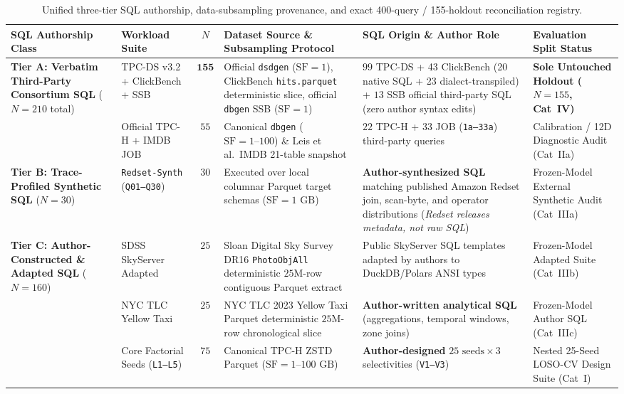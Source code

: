 \documentclass[10pt,a4paper]{article}
\begin{document}
\begin{table}[!t]
\centering
\caption{Unified three-tier SQL authorship, data-subsampling provenance, and exact 400-query / 155-holdout reconciliation registry.}
\label{tab:v12_data_provenance}\label{tab:v13_unified_provenance}
\scriptsize
\setlength{\tabcolsep}{3.5pt}
\renewcommand{\arraystretch}{1.14}
\begin{tabular}{@{}p{2.7cm}p{2.7cm}cp{3.8cm}p{3.4cm}p{2.5cm}@{}}
\toprule
\textbf{SQL Authorship Class} & \textbf{Workload Suite} & \textbf{$N$} & \textbf{Dataset Source \& Subsampling Protocol} & \textbf{SQL Origin \& Author Role} & \textbf{Evaluation Split Status} \\
\midrule
\textbf{Tier A: Verbatim Third-Party Consortium SQL} ($N=210$ total) & TPC-DS v3.2 + ClickBench + SSB & $\mathbf{155}$ & Official \texttt{dsdgen} ($\text{SF}=1$), ClickBench \texttt{hits.parquet} deterministic slice, official \texttt{dbgen} SSB ($\text{SF}=1$) & $99$ TPC-DS + 43 ClickBench (20 native SQL + 23 dialect-transpiled) + $13$ SSB official third-party SQL (zero author syntax edits) & \textbf{Sole Untouched Holdout ($N=155$, Cat~IV)} \\
& Official TPC-H + IMDB JOB & $55$ & Canonical \texttt{dbgen} ($\text{SF}=1\text{--}100$) \& Leis et al.\ IMDB 21-table snapshot & $22$ TPC-H + $33$ JOB (\texttt{1a--33a}) third-party queries & Calibration / 12D Diagnostic Audit (Cat~IIa) \\
\midrule
\textbf{Tier B: Trace-Profiled Synthetic SQL} ($N=30$) & \texttt{Redset-Synth} (\texttt{Q01--Q30}) & $30$ & Executed over local columnar Parquet target schemas ($\text{SF}=1\text{ GB}$) & \textbf{Author-synthesized SQL} matching published Amazon Redset join, scan-byte, and operator distributions (\emph{Redset releases metadata, not raw SQL}) & Frozen-Model External Synthetic Audit (Cat~IIIa) \\
\midrule
\textbf{Tier C: Author-Constructed \& Adapted SQL} ($N=160$) & SDSS SkyServer Adapted & $25$ & Sloan Digital Sky Survey DR16 \texttt{PhotoObjAll} deterministic $25\text{M}$-row contiguous Parquet extract & Public SkyServer SQL templates adapted by authors to DuckDB/Polars ANSI types & Frozen-Model Adapted Suite (Cat~IIIb) \\
& NYC TLC Yellow Taxi & $25$ & NYC TLC 2023 Yellow Taxi Parquet deterministic $25\text{M}$-row chronological slice & \textbf{Author-written analytical SQL} (aggregations, temporal windows, zone joins) & Frozen-Model Author SQL (Cat~IIIc) \\
& Core Factorial Seeds (\texttt{L1--L5}) & $75$ & Canonical TPC-H ZSTD Parquet ($\text{SF}=1\text{--}100\text{ GB}$) & \textbf{Author-designed} $25\text{ seeds}\times 3$ selectivities (\texttt{V1--V3}) & Nested 25-Seed LOSO-CV Design Suite (Cat~I) \\

\end{tabular}
\end{table}
\end{document}
